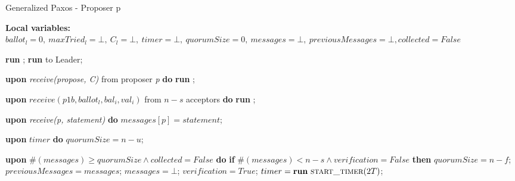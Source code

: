 \documentclass[10pt,pdftex,a4paper]{article}%
\begin{document}
\begin{algorithm}
\caption{Generalized Paxos - Proposer p}
\textbf{Local variables:} $ballot_l = 0,\ maxTried_l = \bot,\ C_l = \bot,\ timer = \bot,\ quorumSize = 0,\ messages = \bot,\ previousMessages = \bot, collected = False$
\begin{algorithmic}[1]

        \State \textbf{run} ;
    \Else
        \State \textbf{run}  to Leader;
    \EndIf
    \EndFunction
        
    \State
    \State \textbf{upon} \textit{receive(propose, C)} from proposer \textit{p} \textbf{do}
        \State \hspace{\algorithmicindent} \textbf{run} ;
    
    \State
    \State \textbf{upon} $receive (p1b, ballot_l, bal_i, val_i)$ from $n-s$ acceptors \textbf{do}
        \State \hspace{\algorithmicindent} \textbf{run} ;
    
    \State
    \State \textbf{upon} \textit{receive(p, statement)} \textbf{do}
    \State \hspace{\algorithmicindent} $messages[p] = statement$;
    
    \State
    \State \textbf{upon} $timer$ \textbf{do} 
    \State \hspace{\algorithmicindent} $quorumSize = n-u$;

    \State     
    \State \textbf{upon} $\#(messages) \geq quorumSize \land collected = False$ \textbf{do} 
        \State \hspace{\algorithmicindent} \textbf{if }{$\#(messages) < n-s \land verification = False$} \textbf{then}
            \State \hspace{\algorithmicindent}\hspace{\algorithmicindent} $quorumSize = n-f$;
            \State \hspace{\algorithmicindent}\hspace{\algorithmicindent}
            $previousMessages = messages$;
            \State \hspace{\algorithmicindent}\hspace{\algorithmicindent}
            $messages = \bot$;
            \State \hspace{\algorithmicindent}\hspace{\algorithmicindent} $verification = True$;
            \State \hspace{\algorithmicindent}\hspace{\algorithmicindent} $timer = \textbf{run}\ \Call{start\_timer}{2T}$;


\end{algorithmic}
\end{algorithm}
\end{document}
